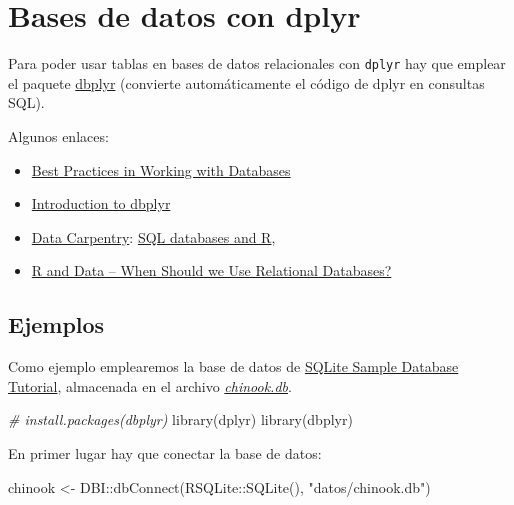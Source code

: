 \documentclass[
]{book}
\newenvironment{Shaded}{\begin{snugshade}}{\end{snugshade}}
\newcommand{\CommentTok}[1]{\textcolor[rgb]{0.56,0.35,0.01}{\textit{#1}}}
\newcommand{\FunctionTok}[1]{\textcolor[rgb]{0.00,0.00,0.00}{#1}}
\newcommand{\NormalTok}[1]{#1}
\newcommand{\OtherTok}[1]{\textcolor[rgb]{0.56,0.35,0.01}{#1}}
\newcommand{\SpecialCharTok}[1]{\textcolor[rgb]{0.00,0.00,0.00}{#1}}
\newcommand{\StringTok}[1]{\textcolor[rgb]{0.31,0.60,0.02}{#1}}
\theoremstyle{break}
\theoremstyle{nonumberplain}
\begin{document}
\hypertarget{dbplyr}{%
\section{Bases de datos con dplyr}\label{dbplyr}}

Para poder usar tablas en bases de datos relacionales con \texttt{dplyr} hay que emplear el paquete \href{https://dbplyr.tidyverse.org}{dbplyr} (convierte automáticamente el código de dplyr en consultas SQL).

Algunos enlaces:

\begin{itemize}
\item
  \href{https://solutions.posit.co/connections/db}{Best Practices in Working with Databases}
\item
  \href{https://dbplyr.tidyverse.org/articles/dbplyr.html}{Introduction to dbplyr}
\item
  \href{https://datacarpentry.org/R-ecology-lesson/index.html}{Data Carpentry}:
  \href{https://datacarpentry.org/R-ecology-lesson/05-r-and-databases.html}{SQL databases and R},
\item
  \href{https://intellixus.com/2018/06/29/r-and-data-when-should-we-use-relational-databases}{R and Data -- When Should we Use Relational Databases?}
\end{itemize}

\hypertarget{ejemplos-3}{%
\subsection{Ejemplos}\label{ejemplos-3}}

Como ejemplo emplearemos la base de datos de \href{https://www.sqlitetutorial.net/sqlite-sample-database/}{SQLite Sample Database Tutorial}, almacenada en el archivo \href{datos/chinook.db}{\emph{chinook.db}}.

\begin{Shaded}
\begin{Highlighting}[]
\CommentTok{\# install.packages(\textquotesingle{}dbplyr\textquotesingle{})}
\FunctionTok{library}\NormalTok{(dplyr)}
\FunctionTok{library}\NormalTok{(dbplyr)}
\end{Highlighting}
\end{Shaded}

En primer lugar hay que conectar la base de datos:

\begin{Shaded}
\begin{Highlighting}[]
\NormalTok{chinook }\OtherTok{\textless{}{-}}\NormalTok{ DBI}\SpecialCharTok{::}\FunctionTok{dbConnect}\NormalTok{(RSQLite}\SpecialCharTok{::}\FunctionTok{SQLite}\NormalTok{(), }\StringTok{"datos/chinook.db"}\NormalTok{)}
\end{Highlighting}
\end{Shaded}
\end{document}
